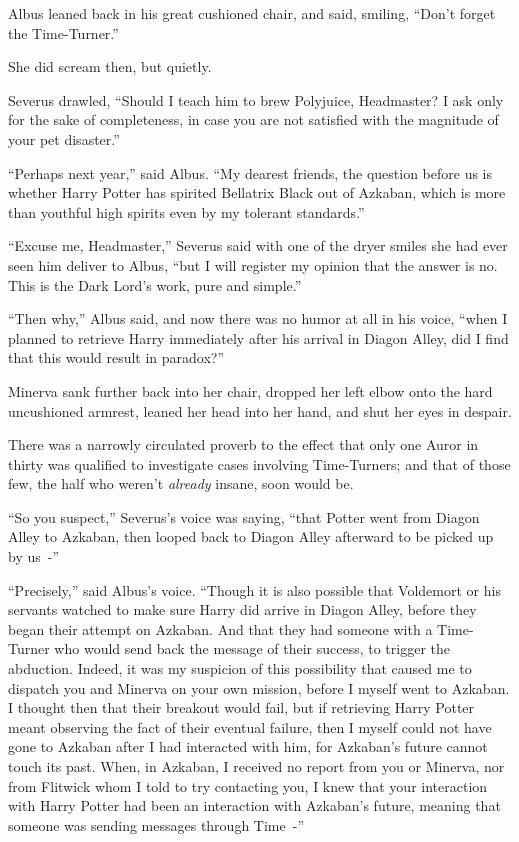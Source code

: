 Albus leaned back in his great cushioned chair, and said, smiling, ``Don't forget the Time-Turner.''

She did scream then, but quietly.

Severus drawled, ``Should I teach him to brew Polyjuice, Headmaster? I ask only for the sake of completeness, in case you are not satisfied with the magnitude of your pet disaster.''

``Perhaps next year,'' said Albus. ``My dearest friends, the question before us is whether Harry Potter has spirited Bellatrix Black out of Azkaban, which is more than youthful high spirits even by my tolerant standards.''

``Excuse me, Headmaster,'' Severus said with one of the dryer smiles she had ever seen him deliver to Albus, ``but I will register my opinion that the answer is no. This is the Dark Lord's work, pure and simple.''

``Then why,'' Albus said, and now there was no humor at all in his voice, ``when I planned to retrieve Harry immediately after his arrival in Diagon Alley, did I find that this would result in paradox?''

Minerva sank further back into her chair, dropped her left elbow onto the hard uncushioned armrest, leaned her head into her hand, and shut her eyes in despair.

There was a narrowly circulated proverb to the effect that only one Auror in thirty was qualified to investigate cases involving Time-Turners; and that of those few, the half who weren't \emph{already} insane, soon would be.

``So you suspect,'' Severus's voice was saying, ``that Potter went from Diagon Alley to Azkaban, then looped back to Diagon Alley afterward to be picked up by us~-''

``Precisely,'' said Albus's voice. ``Though it is also possible that Voldemort or his servants watched to make sure Harry did arrive in Diagon Alley, before they began their attempt on Azkaban. And that they had someone with a Time-Turner who would send back the message of their success, to trigger the abduction. Indeed, it was my suspicion of this possibility that caused me to dispatch you and Minerva on your own mission, before I myself went to Azkaban. I thought then that their breakout would fail, but if retrieving Harry Potter meant observing the fact of their eventual failure, then I myself could not have gone to Azkaban after I had interacted with him, for Azkaban's future cannot touch its past. When, in Azkaban, I received no report from you or Minerva, nor from Flitwick whom I told to try contacting you, I knew that your interaction with Harry Potter had been an interaction with Azkaban's future, meaning that someone was sending messages through Time~-''

